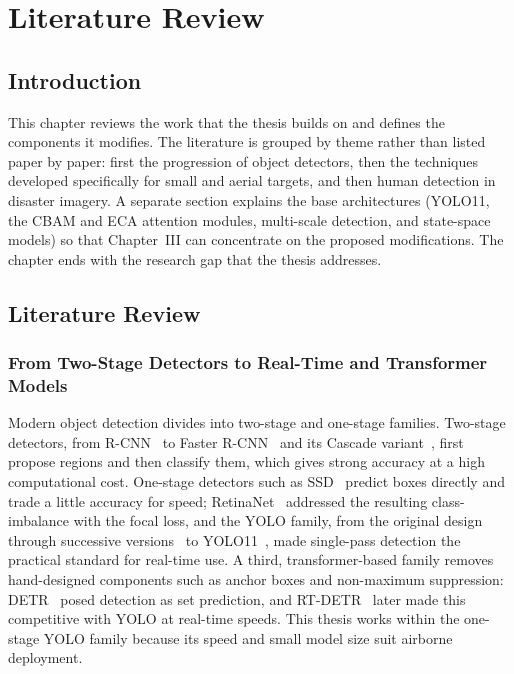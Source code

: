 \chapter{Literature Review}

\section{Introduction}
This chapter reviews the work that the thesis builds on and defines the components
it modifies. The literature is grouped by theme rather than listed paper by paper:
first the progression of object detectors, then the techniques developed
specifically for small and aerial targets, and then human detection in disaster
imagery. A separate section explains the base architectures (YOLO11, the CBAM
and ECA attention modules, multi-scale detection, and state-space models) so
that Chapter~III can concentrate on the proposed modifications. The chapter ends
with the research gap that the thesis addresses.

\section{Literature Review}

\subsection{From Two-Stage Detectors to Real-Time and Transformer Models}
Modern object detection divides into two-stage and one-stage families. Two-stage
detectors, from R-CNN~\cite{girshick2014rcnn} to Faster R-CNN~\cite{ren2015fasterrcnn}
and its Cascade variant~\cite{cai2018cascade}, first propose regions and then
classify them, which gives strong accuracy at a high computational cost. One-stage
detectors such as SSD~\cite{liu2016ssd} predict boxes directly and trade a little
accuracy for speed; RetinaNet~\cite{lin2017focal} addressed the resulting
class-imbalance with the focal loss, and the YOLO family, from the original
design~\cite{redmon2016yolo} through successive versions~\cite{redmon2018yolov3,%
bochkovskiy2020yolov4,wang2023yolov7,jocher2023yolov8,wang2024yolov9,wang2024yolov10}
to YOLO11~\cite{jocher2024yolo11}, made single-pass detection the practical standard
for real-time use. A third, transformer-based family removes hand-designed
components such as anchor boxes and non-maximum suppression: DETR~\cite{carion2020detr}
posed detection as set prediction, and RT-DETR~\cite{zhao2024rtdetr} later made this
competitive with YOLO at real-time speeds. This thesis works within the one-stage
YOLO family because its speed and small model size suit airborne deployment.

